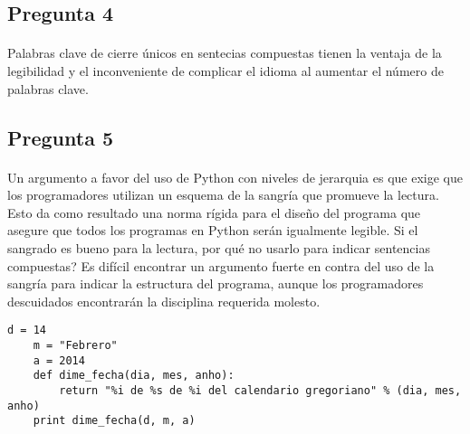 \subsection{Pregunta 4}
\paragraph{ }

Palabras clave de cierre únicos en sentecias compuestas tienen la ventaja de la legibilidad y el inconveniente de complicar el idioma al aumentar el número de palabras clave.

\subsection{Pregunta 5}
\paragraph{ }

Un argumento a favor del uso de Python con niveles de jerarquia es que exige que los programadores utilizan un esquema de la sangría que promueve la lectura. Esto da como resultado una norma rígida para el diseño del programa que asegure que todos los programas en Python serán igualmente legible. Si el sangrado es bueno para la lectura, por qué no usarlo para indicar sentencias compuestas? Es difícil encontrar un argumento fuerte en contra del uso de la sangría para indicar la estructura del programa, aunque los programadores descuidados encontrarán la disciplina requerida molesto.


\begin{lstlisting}[frame=single]
	 d = 14
	m = "Febrero"
	a = 2014
	def dime_fecha(dia, mes, anho):
		return "%i de %s de %i del calendario gregoriano" % (dia, mes, anho)
	print dime_fecha(d, m, a)

\end{lstlisting}
